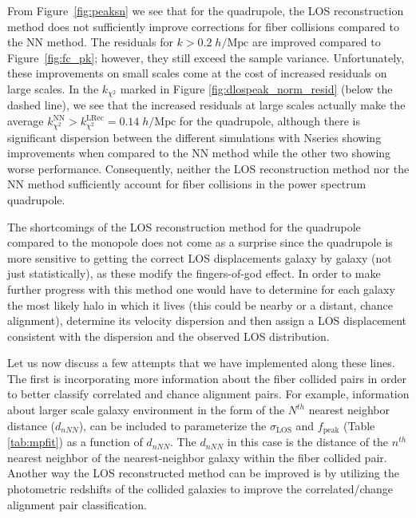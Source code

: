 From Figure~\ref{fig:peaksn} we see that for the quadrupole, the LOS reconstruction method does not 
sufficiently improve corrections for fiber collisions compared to the NN method.
The residuals for $k > 0.2\;h/\mathrm{Mpc}$ are improved compared to Figure~\ref{fig:fc_pk}; however, they 
still exceed the sample variance. Unfortunately, these improvements on small scales
come at the cost of increased residuals on large scales. In the $k_{\chi^2}$ marked 
in Figure \ref{fig:dlospeak_norm_resid} (below the dashed line), we see that the
increased residuals at large scales actually make the average $k_{\chi^2}^\mathrm{NN} > 
k_{\chi^2}^\mathrm{LRec} = 0.14\;h/\mathrm{Mpc}$ for the quadrupole, although there is significant dispersion between the different simulations with Nseries showing improvements when compared to the NN method while the other two showing worse performance. Consequently, neither the LOS reconstruction method nor the NN method sufficiently 
account for fiber collisions in the power spectrum quadrupole. 

The shortcomings of the LOS reconstruction method for the quadrupole compared 
to the monopole does not come as a surprise since the quadrupole is more 
sensitive to getting the correct LOS displacements galaxy by galaxy 
(not just statistically), as these modify the fingers-of-god effect. 
In order to make further progress with this method one would have to 
determine for each galaxy the most likely halo in which it lives 
(this could be nearby or a distant, chance alignment), determine its 
velocity dispersion and then assign a LOS displacement consistent 
with the dispersion and the observed LOS distribution. 

Let us now discuss a few attempts that we have implemented along these lines. 
The first is incorporating more information about the fiber collided pairs 
in order to better classify 
correlated and chance alignment pairs. For example, information about 
larger scale galaxy environment in the form of the $N^{th}$ nearest neighbor 
distance ($d_{nNN}$), can be included to parameterize the $\sigma_\mathrm{LOS}$ 
and $f_\mathrm{peak}$ (Table \ref{tab:mpfit}) as a function of $d_{nNN}$. 
The $d_{nNN}$ in this case is the distance of the $n^{th}$ nearest 
neighbor of the nearest-neighbor galaxy within the fiber collided pair.  
Another way the LOS reconstructed method can be improved is by utilizing 
the photometric redshifts of the collided galaxies to improve the 
correlated/change alignment pair classification. 

